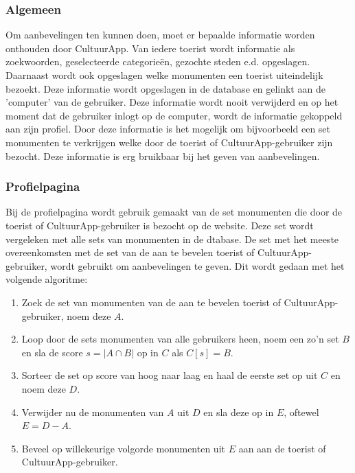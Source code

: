 \documentclass[a4paper,10pt]{article}
\begin{document}
		\subsubsection{Algemeen}
		Om aanbevelingen ten kunnen doen, moet er bepaalde informatie worden onthouden door CultuurApp. Van iedere toerist wordt informatie als zoekwoorden, geselecteerde categorie\"en, gezochte steden e.d. opgeslagen. Daarnaast wordt ook opgeslagen welke monumenten een toerist uiteindelijk bezoekt. Deze informatie wordt opgeslagen in de database en gelinkt aan de 'computer' van de gebruiker. Deze informatie wordt nooit verwijderd en op het moment dat de gebruiker inlogt op de computer, wordt de informatie gekoppeld aan zijn profiel. Door deze informatie is het mogelijk om bijvoorbeeld een set monumenten te verkrijgen welke door de toerist of CultuurApp-gebruiker zijn bezocht. Deze informatie is erg bruikbaar bij het geven van aanbevelingen.
	
		\subsubsection{Profielpagina}
		Bij de profielpagina wordt gebruik gemaakt van de set monumenten die door de toerist of CultuurApp-gebruiker is bezocht op de website. Deze set wordt vergeleken met alle sets van monumenten in de dtabase. De set met het meeste overeenkomsten met de set van de aan te bevelen toerist of CultuurApp-gebruiker, wordt gebruikt om aanbevelingen te geven. Dit wordt gedaan met het volgende algoritme:
		\begin{enumerate}
			\item Zoek de set van monumenten van de aan te bevelen toerist of CultuurApp-gebruiker, noem deze $A$.
			\item Loop door de sets monumenten van alle gebruikers heen, noem een zo'n set $B$ en sla de score $s = |A \cap B|$ op in $C$ als $C\left[s\right] = B$.
			\item Sorteer de set op score van hoog naar laag en haal de eerste set op uit $C$ en noem deze $D$.
			\item Verwijder nu de monumenten van $A$ uit $D$ en sla deze op in $E$, oftewel $E = D - A$.
			\item Beveel op willekeurige volgorde monumenten uit $E$ aan aan de toerist of CultuurApp-gebruiker.
		\end{enumerate}
		
\end{document}
